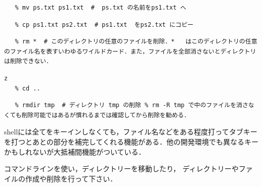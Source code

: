    \begin{lstlisting}
   % mv ps.txt ps1.txt  #  ps.txt の名前をps1.txt へ
   \end{lstlisting}
   \begin{lstlisting}
   % cp ps1.txt ps2.txt  # ps1.txt  をps2.txt にコピー
   \end{lstlisting}
   \begin{lstlisting}
   % rm *  # このディレクトリの任意のファイルを削除．*   はこのディレクトリの任意のファイル名を表すいわゆるワイルドカード．また，ファイルを全部消さないとディレクトリは削除できない．
   \end{lstlisting}
   \begin{lstlisting}z
   % cd ..  
   \end{lstlisting}
   \begin{lstlisting}
   % rmdir tmp  # ディレクトリ tmp の削除 % rm -R tmp で中のファイルを消さなくても削除可能ではあるが慣れるまでは確認してから削除を勧める．

   \end{lstlisting}
\emptyline

shellには全てをキーインしなくても，ファイル名などをある程度打ってタブキーを打つとあとの部分を補完してくれる機能がある．他の開発環境でも異なるキーかもしれないが大抵補間機能がついている．

   
\begin{Q}
   コマンドラインを使い，ディレクトリーを移動したり，
   ディレクトリーやファイルの作成や削除を行って下さい．
\end{Q}

%
%

